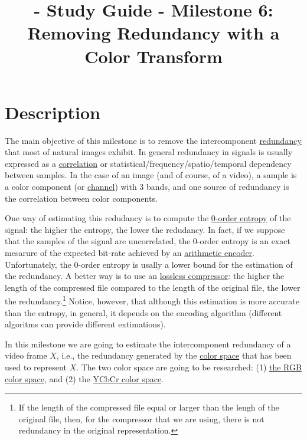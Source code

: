 
\title{\SM{} - Study Guide - Milestone 6: Removing Redundancy with a Color Transform}

\maketitle

\section{Description}

The main objective of this milestone is to remove the intercomponent
\href{https://en.wikipedia.org/wiki/Data_redundancy}{redundancy} that
most of natural images exhibit. In general redundancy in signals is
usually expressed as a
\href{https://en.wikipedia.org/wiki/Correlation_and_dependence}{correlation}
or statistical/frequency/spatio/temporal dependency between
samples. In the case of an image (and of course, of a video), a sample
is a color component (or
\href{https://en.wikipedia.org/wiki/Color_image}{channel}) with 3
bands, and one source of redundancy is the correlation between color
components.

One way of estimating this redudancy is to compute the
\href{https://en.wikipedia.org/wiki/Entropy_(information_theory)}{0-order
  entropy} of the signal: the higher the entropy, the lower the
redudancy. In fact, if we suppose that the samples of the signal are
uncorrelated, the 0-order entropy is an exact mesarure of the expected
bit-rate achieved by an
\href{https://en.wikipedia.org/wiki/Arithmetic_coding}{arithmetic
  encoder}. Unfortunately, the 0-order entropy is usally a lower bound
for the estimation of the redundancy. A better way is to use an
\href{https://en.wikipedia.org/wiki/Data_compression}{lossless
  compressor}: the higher the length of the compressed file compared
to the length of the original file, the lower the
redundancy.\footnote{If the length of the compressed file equal or
  larger than the lengh of the original file, then, for the compressor
  that we are using, there is not redundancy in the original
  representation.} Notice, however, that although this estimation is
more accurate than the entropy, in general, it depends on the encoding
algorithm (different algoritms can provide different extimations).

In this milestone we are going to estimate the intercomponent
redundancy of a video frame $X$, i.e., the redundancy generated by the
\href{https://en.wikipedia.org/wiki/Color_space}{color space} that has
been used to represent $X$. The two color space are going to be
researched: (1)
\href{https://en.wikipedia.org/wiki/RGB_color_model}{the RGB color
  space}, and (2) the \href{https://en.wikipedia.org/wiki/YCbCr}{YCbCr
  color space}.

